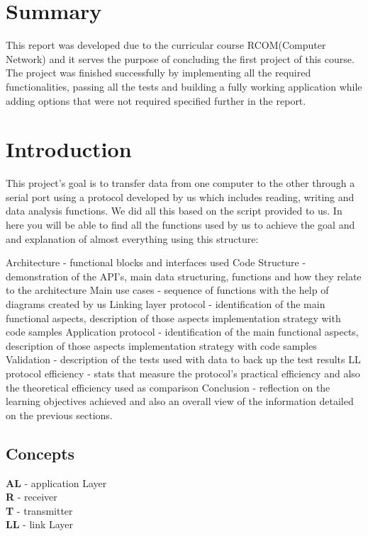 \documentclass[contents.tex]{subfiles}
\begin{document}
\section{Summary}\label{sec:summary}
    This report was developed due to the curricular course RCOM(Computer Network) and it serves the purpose of concluding the first project of this course.
The project was finished successfully by implementing all the required functionalities, passing all the tests and building a fully working application while adding options that were not required specified further in the report.

\section{Introduction}
\label{sec:intro}

	This project’s goal is to transfer data from one computer to the other through a
	serial port using a protocol developed by us which includes reading, writing and data analysis functions. We did all this based on the script provided to us.
	In here you will be able to find all the functions used by us to achieve the goal
	and and explanation of almost everything using this structure:

Architecture - functional blocks and interfaces used
Code Structure - demonstration of the API’s, main data structuring, functions and how they relate to the architecture
Main use cases - sequence of functions with the help of diagrams created by us
Linking layer protocol - identification of the main functional aspects, description of those aspects implementation strategy with code samples
Application protocol - identification of the main functional aspects, description of those aspects implementation strategy with code samples
Validation - description of the tests used with data to back up the test results
LL protocol efficiency - stats that measure the protocol’s practical efficiency and also the theoretical efficiency used as comparison
Conclusion - reflection on the learning objectives achieved and also an overall view of the information detailed on the previous sections.

\subsection{Concepts}\label{sec:concepts}
\textbf{AL} - application Layer\\
\textbf{R} - receiver\\
\textbf{T} - transmitter\\
\textbf{LL} - link Layer\\
\end{document}
